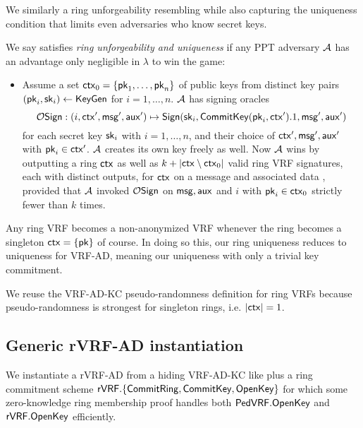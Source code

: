 We similarly a ring unforgeability resembling
 \cite[pp. 7 Def. 7]{cryptoeprint:2005:304} %
while also capturing the uniqueness condition that limits even adversaries who know secret keys.

\begin{definition}
We say \rVRF satisfies {\em ring unforgeability and uniqueness} if
any PPT adversary $\mathcal{A}$ has an advantage only
 negligible in $\lambda$ to win the game:
\begin{itemize}
\item[]
 Assume a set $\mathsf{ctx}_0 = \{ \mathsf{pk}_1,\ldots,\mathsf{pk}_n \}$ of public keys from
 distinct key pairs $(\mathsf{pk}_i,\mathsf{sk}_i) \leftarrow {\ensuremath{\mathsf{KeyGen}}}$ for $i=1,\ldots,n$.
 $\mathcal{A}$ has signing oracles
 $$ \mathcal{O}\mathsf{Sign} : (i,\mathsf{ctx}',\mathsf{msg}',\mathsf{aux}') \mapsto
  {\ensuremath{\mathsf{Sign}}}(\mathsf{sk}_i,{\mathsf{CommitKey}}(\mathsf{pk}_i,\mathsf{ctx}').1,\mathsf{msg}',\mathsf{aux}') $$
 for each secret key $\mathsf{sk}_i$ with $i=1,\ldots,n$, and
  their choice of $\mathsf{ctx}',\mathsf{msg}',\mathsf{aux}'$ with $\mathsf{pk}_i \in \mathsf{ctx}'$.
 $\mathcal{A}$ creates its own key freely as well.
 Now $\mathcal{A}$ wins by outputting a ring $\mathsf{ctx}$ as well as
 $k + |\mathsf{ctx} \setminus \mathsf{ctx}_0|$ valid ring VRF signatures, each with distinct outputs,    %
 for $\mathsf{ctx}$ on a message \msg and associated data \aux, provided that
 $\mathcal{A}$ invoked $\mathcal{O}\mathsf{Sign}$ on $\mathsf{msg},\mathsf{aux}$ and $i$ with $\mathsf{pk}_i \in \mathsf{ctx}_0$
  strictly fewer than $k$ times.
\end{itemize}
\end{definition}

Any ring VRF becomes a non-anonymized VRF whenever
 the ring becomes a singleton $\mathsf{ctx} = \{ \mathsf{pk} \}$ of course.
In doing so this, our ring uniqueness reduces to uniqueness for VRF-AD,
meaning our uniqueness with only a trivial key commitment.

We reuse the VRF-AD-KC pseudo-randomness definition for ring VRFs
because pseudo-randomness is strongest for singleton rings, i.e. $|\mathsf{ctx}| = 1$.


\subsection{Generic rVRF-AD instantiation}

We instantiate a rVRF-AD from a hiding VRF-AD-KC like \PedVRF plus
a ring commitment scheme
 ${\mathsf{rVRF}}.\{ {\mathsf{CommitRing}}, {\mathsf{CommitKey}}, {\mathsf{OpenKey}} \}$
for which some zero-knowledge ring membership proof handles both
 ${\mathsf{PedVRF}}.{\mathsf{OpenKey}}$ and ${\mathsf{rVRF}}.{\mathsf{OpenKey}}$
efficiently.

